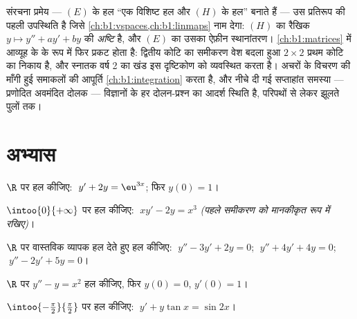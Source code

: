 \begin{remark}[यह अध्याय कहाँ काम आता है]\label{rem:b1:diffeq:whereused}
संरचना प्रमेय --- $(E)$ के हल ``एक विशिष्ट हल और $(H)$ के हल'' बनाते हैं ---
उस प्रतिरूप की पहली उपस्थिति है जिसे \cref{ch:b1:vspaces,ch:b1:linmaps} नाम
देगा: $(H)$ का  रैखिक  $y \mapsto y'' + ay' + by$ की
\emph{अष्टि} है, और $(E)$ का  उसका ऐफ़ीन स्थानांतरण।  \cref{ch:b1:matrices} में आव्यूह के  के रूप में फिर
प्रकट होता है: द्वितीय कोटि का समीकरण वेश बदला हुआ $2 \times 2$ प्रथम कोटि
का निकाय है, और स्नातक वर्ष 2 का खंड इस दृष्टिकोण को व्यवस्थित करता है।
अचरों के विचरण की माँगी हुई समाकलों की आपूर्ति \cref{ch:b1:integration} करता
है, और नीचे दी गई सप्ताहांत समस्या --- प्रणोदित अवमंदित दोलक --- विज्ञानों
के हर दोलन-प्रश्न का आदर्श स्थिति है, परिपथों से लेकर झूलते पुलों तक।
\end{remark}

\section{अभ्यास}

\begin{exercise}[$\star$]\label{exo:b1:diffeq:1}
$\R$ पर हल कीजिए: $\;y' + 2y = \eu^{3x}$; फिर  $y(0) = 1$।
\end{exercise}

\begin{exercise}[$\star$]\label{exo:b1:diffeq:2}
$\intoo{0}{+\infty}$ पर हल कीजिए: $\;x y' - 2y = x^3$ \emph{(पहले समीकरण को
मानकीकृत रूप में रखिए)}।
\end{exercise}

\begin{exercise}[$\star$]\label{exo:b1:diffeq:3}
$\R$ पर वास्तविक व्यापक हल देते हुए हल कीजिए: $\;y'' - 3y' + 2y = 0$; $\;y''
+ 4y' + 4y = 0$; $\;y'' - 2y' + 5y = 0$।
\end{exercise}

\begin{exercise}[$\star$]\label{exo:b1:diffeq:4}
$\R$ पर $y'' - y = x^2$ हल कीजिए, फिर  $y(0) = 0$, $y'(0) = 1$।
\end{exercise}

\begin{exercise}[$\star\star$]\label{exo:b1:diffeq:5}
$\intoo{-\frac\pi2}{\frac\pi2}$ पर हल कीजिए: $\;y' + y\tan x = \sin 2x$।
\end{exercise}


